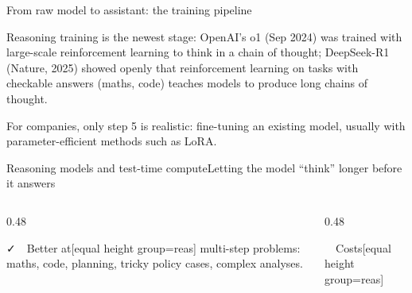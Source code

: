 \documentclass[aspectratio=169,11pt]{beamer}
\begin{document}
\begin{frame}{From raw model to assistant: the training pipeline}
{  Reasoning training is the newest stage: OpenAI's o1 (Sep 2024) was trained with large-scale reinforcement learning to think in a chain of thought; DeepSeek-R1 (Nature, 2025) showed openly that reinforcement learning on tasks with checkable answers (maths, code) teaches models to produce long chains of thought.\par
  For companies, only step 5 is realistic: fine-tuning an existing model, usually with parameter-efficient methods such as LoRA.}
\end{frame}

\begin{frame}{Reasoning models and test-time compute}{Letting the model ``think'' longer before it answers}
  \centering
  \par\vspace{10pt}
  \begin{columns}[T]
    \begin{column}{0.48\textwidth}
      \begin{card}[cGreen]{\faCheck\ \ Better at}[equal height group=reas]
        multi-step problems: maths, code, planning, tricky policy cases, complex analyses.
      \end{card}
    \end{column}
    \begin{column}{0.48\textwidth}
      \begin{card}[cRed]{\faTimes\ \ Costs}[equal height group=reas]

\end{card}
\end{column}
\end{columns}
\end{frame}
\end{document}
